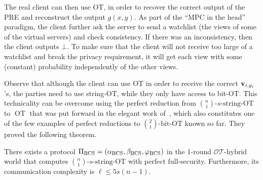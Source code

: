 \documentclass{llncs}
\newcommand{\OT}{\operatorname{OT}}
\newcommand{\OTfunc}{\mathcal{OT}}
\newcommand{\OThybrid}{\OTfunc\mbox{-}\text{hybrid}}
\newcommand{\bOT}[2]{\binom{#2}{#1}\text{-bit-OT}}
\newcommand{\sOT}[3]{\binom{#2}{#1}\text{-}#3\text{-string-OT}}
\newcommand{\stb}{\operatorname{BCS}}
\renewcommand{\v}{\myvec{v}}
\newcommand{\srvr}{\alpha}
\newcommand{\clnt}{\beta}
\newcommand{\local}{\varphi}
\renewcommand{\Sc}{\mathsf{S}}
\newcommand{\Cc}{\mathsf{C}}
\begin{document}
The real client can then use OT, in order to recover the correct output of the PRE and reconstruct the output $g(x,y)$. As part of the ``MPC in the head'' paradigm, the client further ask the server to send a watchlist (the views of some of the virtual servers) and check consistency. If there was an inconsistency, then the client outputs $\bot$. To make sure that the client will not receive too large of a watchlist and break the privacy requirement, it will get each view with some (constant) probability independently of the other views.

Observe that although the client can use OT in order to receive the correct $\v_{i,y_i}$'s, the parties need to use string-OT, while they only have access to bit-OT. This technicality can be overcome using the perfect reduction from $\sOT{1}{n}{s}$ to $\OT$  that was put forward in the elegant work of~\citet{BCS96}, which also constitutes one of the few examples of perfect reductions to $\bOT{1}{2}$ known so far. They proved the following theorem.

\begin{theorem}\label{thm-int}%
	There exists a protocol $\Pi_{\stb}=\vect{\srvr_{\stb},\clnt_{\stb},\local_{\stb}}$ in the 1-round $\OThybrid$ world that computes $\sOT{1}{n}{s}$ with perfect full-security. Furthermore, its communication complexity is $\ell\leq 5s(n-1)$. 
\end{theorem}
\end{document}
